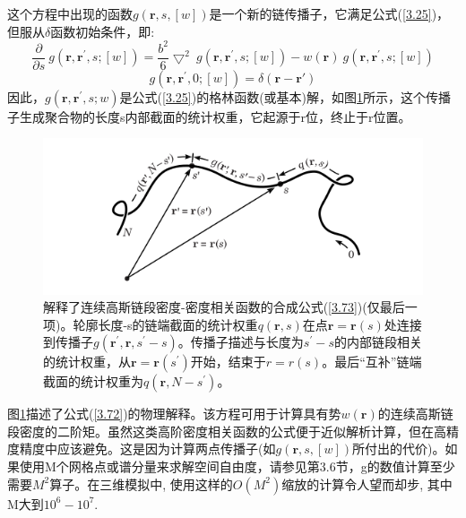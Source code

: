 这个方程中出现的函数$g(\mathbf{r},s,[w])$是一个新的链传播子，它满足公式(\ref{3.25})，但服从$\delta$函数初始条件，即:
\begin{equation}\label{3.74}
\frac{\partial}{\partial s}~g(\mathbf{r},\mathbf{r}^{'},s;[w])=\frac{b^2}{6}\bigtriangledown^2~g(\mathbf{r},\mathbf{r}^{'},s;[w])-w(\mathbf{r})~g(\mathbf{r},\mathbf{r}^{'},s;[w])
\end{equation}
\begin{equation}\label{3.75}
g(\mathbf{r},\mathbf{r}^{'},0;[w])=\delta(\mathbf{r}-\mathbf{r}{'})
\end{equation}
因此，$g(\mathbf{r},\mathbf{r}^{'},s;w)$是公式(\ref{3.25})的格林函数(或基本)解，如图\ref{figure2}所示，这个传播子生成聚合物的长度s内部截面的统计权重，它起源于r位，终止于r位置。
\begin{figure}[h]
\centering
\includegraphics[width=15cm]{./figures/33.png}
\caption{解释了连续高斯链段密度-密度相关函数的合成公式(\ref{3.73})(仅最后一项)。轮廓长度-s的链端截面的统计权重$q(\mathbf{r},s)$在点$\mathbf{r}=\mathbf{r}(s)$处连接到传播子$g(\mathbf{r}^{'},\mathbf{r},s^{'}-s)$。传播子描述与长度为$s^{'}-s$的内部链段相关的统计权重，从$\mathbf{r}=\mathbf{r}(s^{'})$开始，结束于$r=r(s)$。最后“互补”链端截面的统计权重为$q(\mathbf{r},N-s^{'})$。}
\label{figure2}
\end{figure}

图\ref{figure2}描述了公式(\ref{3.72})的物理解释。该方程可用于计算具有势$w(\mathbf{r})$的连续高斯链段密度的二阶矩。虽然这类高阶密度相关函数的公式便于近似解析计算，但在高精度精度中应该避免。这是因为计算两点传播子(如$g(\mathbf{r},s,[w])$所付出的代价)。如果使用M个网格点或谱分量来求解空间自由度，请参见第3.6节，g的数值计算至少需要$M^2$算子。在三维模拟中, 使用这样的$O(M^2)$缩放的计算令人望而却步, 其中M大到$10^6-10^7$.
